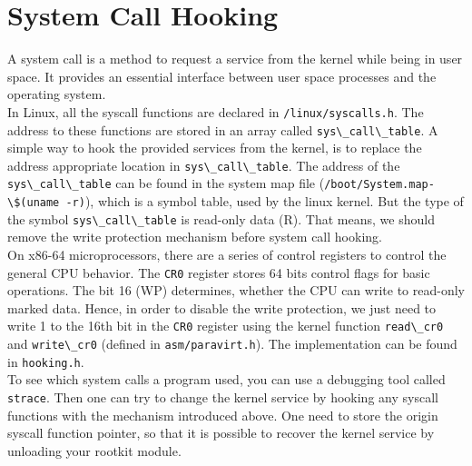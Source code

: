 \section{System Call Hooking}
\label{sec:syscallHooking}
A system call is a method to request a service from the kernel while being in user space. It provides an essential interface between user space processes and the operating system.\\
In Linux, all the syscall functions are declared in \verb+/linux/syscalls.h+. The address to these functions are stored in an array called \verb+sys\_call\_table+. 
A simple way to hook the provided services from the kernel, is to replace the address appropriate location in \verb+sys\_call\_table+. The address of the \verb+sys\_call\_table+ can be found in the system map file (\verb+/boot/System.map-\$(uname -r)+), which is a symbol table, used by the linux kernel. But the type of the symbol \verb+sys\_call\_table+ is read-only data (R). That means, we should remove the write protection mechanism before system call hooking.\\
On x86-64 microprocessors, there are a series of control registers to control the general CPU behavior. The \texttt{CR0} register stores 64 bits control flags for basic operations. The bit 16 (WP) determines, whether the CPU can write to read-only marked data. Hence, in order to disable the write protection, we just need to write 1 to the 16th bit in the \texttt{CR0} register using the kernel function \verb+read\_cr0+ and \verb+write\_cr0+ (defined in \verb+asm/paravirt.h+). The implementation can be found in \verb+hooking.h+.\\
To see which system calls a program used, you can use a debugging tool called \texttt{strace}. Then one can try to change the kernel service by hooking any syscall functions with the mechanism introduced above. One need to store the origin syscall function pointer, so that it is possible to recover the kernel service by unloading your rootkit module. 
